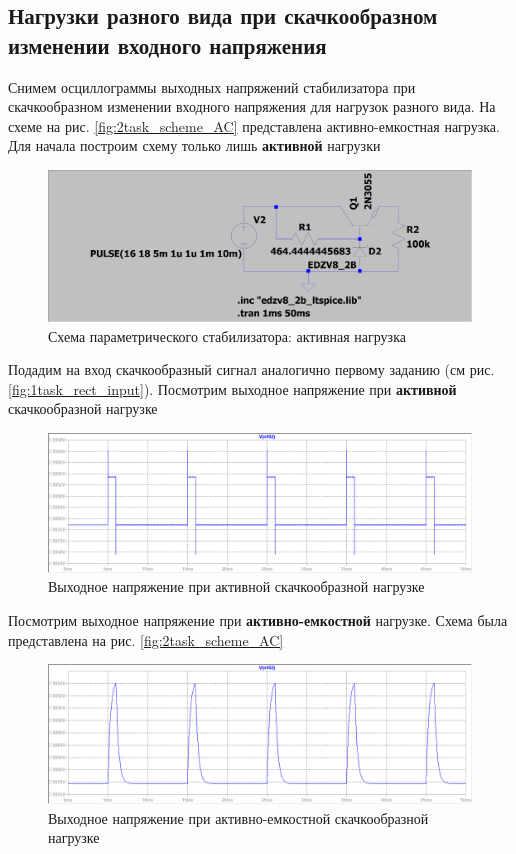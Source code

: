 \documentclass[a4paper, 12pt]{article}
\begin{document}
    \subsection{Нагрузки разного вида при скачкообразном изменении входного напряжения}
    Снимем осциллограммы выходных напряжений стабилизатора при скачкообразном
    изменении входного напряжения для нагрузок разного вида. На схеме на рис. \ref{fig:2task_scheme_AC}
    представлена активно-емкостная нагрузка. Для начала построим схему только лишь \textbf{активной} нагрузки
    \begin{figure}[H]
        \centering
        \includegraphics[scale=0.22]{2task_scheme_A.png}
        \captionsetup{skip=0pt}
        \caption{Схема параметрического стабилизатора: активная нагрузка}
        \label{fig:2task_scheme_A}
    \end{figure}
    \noindent Подадим на вход скачкообразный сигнал аналогично первому заданию (см рис. \ref{fig:1task_rect_input}).
    Посмотрим выходное напряжение при \textbf{активной} скачкообразной нагрузке
    \begin{figure}[H]
        \centering
        \includegraphics[scale=0.46]{2task_rect_A.png}
        \captionsetup{skip=0pt}
        \caption{Выходное напряжение при активной скачкообразной нагрузке}
        \label{fig:2task_rect_A}
    \end{figure}
    \noindent Посмотрим выходное напряжение при \textbf{активно-емкостной} нагрузке. Схема
    была представлена на рис. \ref{fig:2task_scheme_AC}
    \begin{figure}[H]
        \centering
        \includegraphics[scale=0.46]{2task_rect_AC.png}
        \captionsetup{skip=0pt}
        \caption{Выходное напряжение при активно-емкостной скачкообразной нагрузке}
        \label{fig:2task_rect_AC}
    \end{figure}
\end{document}
